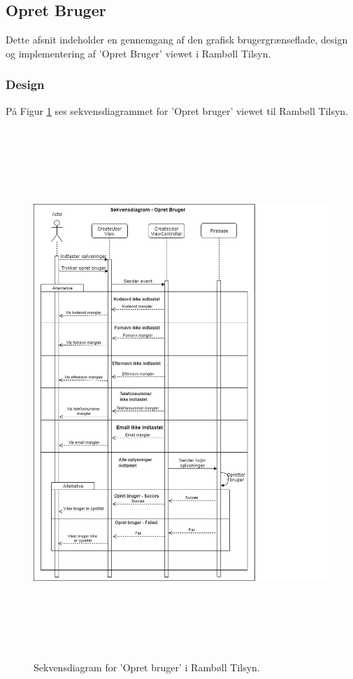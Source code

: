 \subsection{Opret Bruger}\label{sec:Opretbruger}
Dette afsnit indeholder en gennemgang af den grafisk brugergrænseflade, design og implementering af 'Opret Bruger' viewet i Rambøll Tilsyn.

\subsubsection{Design}
På Figur \ref{fig:OpretBrugerSekvens} ses sekvensdiagrammet for 'Opret bruger' viewet til Rambøll Tilsyn.
\begin{figure}[H] %
	\centering
	\includegraphics[height=20cm, width=15cm]{Design/Applikation/OpretBruger/OpretBrugerSekvensDiagram}
	\caption{Sekvensdiagram for 'Opret bruger' i Rambøll Tilsyn.}
	\label{fig:OpretBrugerSekvens}
\end{figure}

